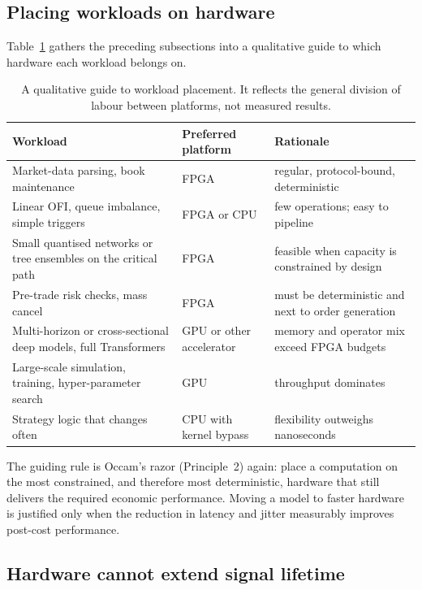 \subsection{Placing workloads on hardware}

Table~\ref{tab:placement} gathers the preceding subsections into a qualitative guide to which hardware each
workload belongs on.

\begin{table}[!htbp]
\centering\small
\caption{A qualitative guide to workload placement. It reflects the general division of labour
between platforms, not measured results.}
\label{tab:placement}
\begin{tabularx}{\linewidth}{lXX}
\toprule
Workload & Preferred platform & Rationale \\
\midrule
Market-data parsing, book maintenance & FPGA & regular, protocol-bound, deterministic \\
Linear OFI, queue imbalance, simple triggers & FPGA or CPU & few operations; easy to pipeline \\
Small quantised networks or tree ensembles on the critical path & FPGA & feasible when capacity is
  constrained by design \\
Pre-trade risk checks, mass cancel & FPGA & must be deterministic and next to order generation \\
Multi-horizon or cross-sectional deep models, full Transformers & GPU or other accelerator &
  memory and operator mix exceed FPGA budgets \\
Large-scale simulation, training, hyper-parameter search & GPU & throughput dominates \\
Strategy logic that changes often & CPU with kernel bypass & flexibility outweighs nanoseconds \\
\bottomrule
\end{tabularx}
\end{table}

The guiding rule is Occam's razor (Principle~2) again: place a computation on the most constrained, and
therefore most deterministic, hardware that still delivers the required economic performance.
Moving a model to faster hardware is justified only when the reduction in latency and jitter
measurably improves post-cost performance.

\subsection{Hardware cannot extend signal lifetime}
\label{sec:hw-lifetime}

